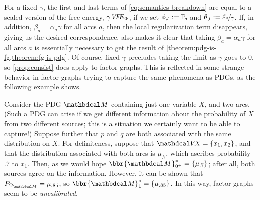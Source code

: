 For a fixed $\gamma$, the first and last terms
of \eqref{eq:semantics-breakdown} are equal to a scaled
version of the free energy, $\gamma\mathit{V\mkern-4mu F\mkern-4.5mu E}_\Phi$, 
if we set $\phi_J := \p_a$ and $\theta_J := \nicefrac{\beta_a}{\gamma}$.  
If, in addition, $\beta_a = {\alpha_a}\gamma$ for all
arcs $a$, then
the local regularization term disappears, giving us
the desired correspondence. 
%
%
 also makes it clear that 
taking $\beta_a = {\alpha_a} \gamma$ for all arcs $a$ is
essentially necessary to get the result of \cref{theorem:pdg-is-fg,theorem:fg-is-pdg}.
Of course, fixed $\gamma$ precludes 
    taking the limit as $\gamma$ goes to 0, so 
    \cref{prop:consist} does apply to factor graphs. 
This is reflected in some strange
behavior in factor graphs trying to capture the same phenomena as
PDGs, as the following example shows.

\begin{example}\label{ex:overdet}
Consider the PDG $\dg M$ containing just one variable
    $X$, and two arcs.
(Such a PDG can arise if we get different information about the probability of $X$ from two different sources; this is a situation we certainly want to be able to capture!)
Suppose further that $p$ and $q$ are both associated with the same distribution on $X$.
For definiteness, suppose that
$\V\!X = \{x_1,x_2\}$, and
that the distribution associated with both arcs is $\mu_{.7}$, which ascribes
probability $.7$ to $x_1$. Then, as we would hope  $\bbr{\dg M}^*_{0^+} =
\{\mu_{.7}\}$; after all, both sources agree on the information.
However, it can be shown that 
$\Pr_{\WFGof{\dg M}} = \mu_{.85}$, so  $\bbr{\dg M}_1^* = \{\mu_{.85}\}$.
In this way, factor graphs seem to be \emph{uncalibrated}. 

%
\end{example}


